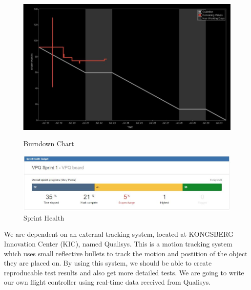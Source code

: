 \begin{figure}[h]
        \centering
         \begin{minipage}[b]{0.3\textwidth}
            \includegraphics[width = 1\textwidth]{VAPIQ-PICTURES/BDC}
            \caption{Burndown Chart}
            \label{fig:bdc}
        \end{minipage}
        \hfill
        \begin{minipage}[b]{0.6\textwidth}
            \includegraphics[width = 1\textwidth]{VAPIQ-PICTURES/SH}
            \caption{Sprint Health}
            \label{fig:sh}
        \end{minipage}
\end{figure}


\vspace*{1cm}
\noindent
We are dependent on an external tracking system, located at KONGSBERG Innovation Center (KIC), named Qualisys. This is a motion tracking system which uses small reflective bullets to track the motion and postition of the object they are placed on. By using this system, we should be able to create reproducable test results and also get more detailed tests. We are going to write our own flight controller using real-time data received from Qualisys. 
\\ 


